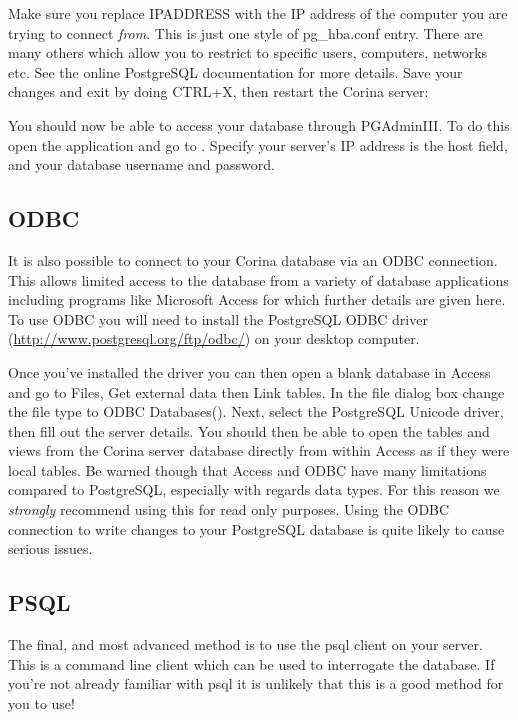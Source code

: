 Make sure you replace IPADDRESS with the IP address of the computer you are trying to connect \emph{from}. This is just one style of pg\_hba.conf entry.  There are many others which allow you to restrict to specific users, computers, networks etc.  See the online PostgreSQL documentation for more details.  Save your changes and exit by doing CTRL+X, then restart the Corina server:


You should now be able to access your database through PGAdminIII. To do this open the application and go to .  Specify your server's IP address is the host field, and your database username and password.


\subsection{ODBC}
It is also possible to connect to your Corina database via an ODBC connection.  This allows limited access to the database from a variety of database applications including programs like Microsoft Access for which further details are given here.   To use ODBC you will need to install the PostgreSQL ODBC driver (\url{http://www.postgresql.org/ftp/odbc/}) on your desktop computer.

Once you've installed the driver you can then open a blank database in Access and go to Files, Get external data then Link tables.  In the file dialog box change the file type to ODBC Databases().  Next, select the PostgreSQL Unicode driver, then fill out the server details.  You should then be able to open the tables and views from the Corina server database directly from within Access as if they were local tables.  Be warned though that Access and ODBC have many limitations compared to PostgreSQL, especially with regards data types.  For this reason we \emph{strongly} recommend using this for read only purposes.  Using the ODBC connection to write changes to your PostgreSQL database is quite likely to cause serious issues. 

\subsection{PSQL}
The final, and most advanced method is to use the psql client on your server.  This is a command line client which can be used to interrogate the database.  If you're not already familiar with psql it is unlikely that this is a good method for you to use!


